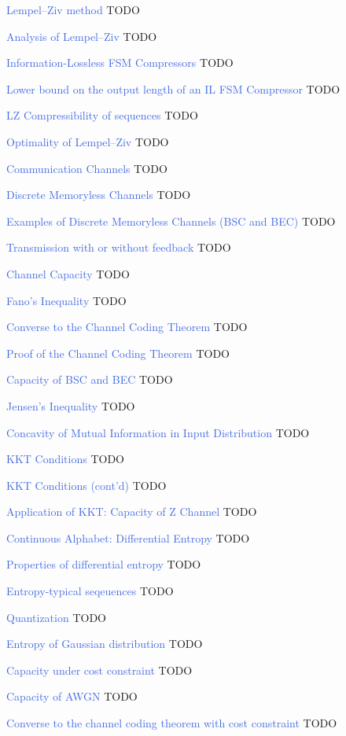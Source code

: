 \documentclass[10pt,a4paper,landscape]{article}
\newcommand{\concept}[1]{\textcolor{RoyalBlue}{#1}}
\renewcommand{\section}[1]{
    \vspace{-0.3cm}
    \begin{center}
      \color{Bittersweet}
      \hrulefill{\small~~#1~~}\hrulefill
    \end{center}
    \vspace{-0.3cm}
  }
\begin{document}
\begin{multicols*}{4}
\concept{Lempel–Ziv method} TODO 

\concept{Analysis of Lempel–Ziv} TODO

\concept{Information-Lossless FSM Compressors} TODO

\concept{Lower bound on the output length of an IL FSM Compressor} TODO

\concept{LZ Compressibility of sequences} TODO

\concept{Optimality of Lempel–Ziv} TODO

\section{Channels}

\concept{Communication Channels} TODO

\concept{Discrete Memoryless Channels} TODO

\concept{Examples of Discrete Memoryless Channels (BSC and BEC)} TODO

\concept{Transmission with or without feedback} TODO

\concept{Channel Capacity} TODO

\concept{Fano's Inequality} TODO

\concept{Converse to the Channel Coding Theorem	} TODO
			
\concept{Proof of the Channel Coding Theorem} TODO

\concept{Capacity of BSC and BEC } TODO

\concept{Jensen's Inequality } TODO

\concept{Concavity of Mutual Information in Input Distribution} TODO
 
\concept{KKT Conditions} TODO

\concept{KKT Conditions (cont'd)} TODO
 
\concept{Application of KKT: Capacity of Z Channel} TODO
 
\concept{Continuous Alphabet: Differential Entropy} TODO

\concept{Properties of differential entropy} TODO
 
\concept{Entropy-typical seqeuences} TODO
 
\concept{Quantization} TODO
 
\concept{Entropy of Gaussian distribution} TODO

\concept{Capacity under cost constraint} TODO
 
\concept{Capacity of AWGN} TODO
 
\concept{Converse to the channel coding theorem with cost constraint} TODO
 

\end{multicols*}
\end{document}
